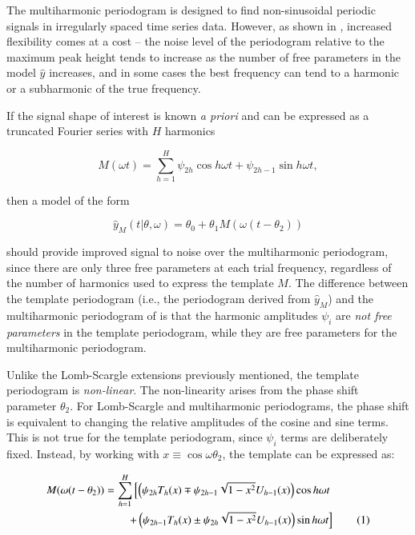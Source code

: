 \documentclass{webofc}
\newcommand\numberthis{\addtocounter{equation}{1}\tag{\theequation}}
\begin{document}
The multiharmonic periodogram is designed to find non-sinusoidal periodic signals in irregularly spaced time series data. However,
as shown in \cite{Vanderplas+Ivezic_2015}, increased flexibility comes at a cost -- the noise level of the periodogram relative to the 
maximum peak height tends to increase as the number of free parameters in the model $\hat{y}$ increases, and in some cases the best frequency
can tend to a harmonic or a subharmonic of the true frequency.

If the signal shape of interest is known \emph{a priori} and can be expressed as a truncated Fourier series with 
$H$ harmonics 

\begin{equation}\label{eq:template}
M(\omega t) = \sum_{h=1}^{H}\psi_{2h}\cos{h \omega t} + \psi_{2h-1}\sin{h \omega t},
\end{equation}

\noindent then a model of the form

\begin{equation}\label{eq:yhatftp}
\hat{y}_M(t|\theta, \omega) = \theta_0 + \theta_1 M(\omega (t - \theta_2))
\end{equation}

\noindent should provide improved signal to noise over the multiharmonic periodogram, since there are only three free parameters at
each trial frequency, regardless of the number of harmonics used to express the template $M$. The difference between the template
periodogram (i.e., the periodogram derived from $\hat{y}_M$) and the multiharmonic periodogram of \cite{Schwarzenberg-Czerny_1996,Palmer_2009} is that the
harmonic amplitudes $\psi_i$ are \emph{not free parameters} in the template periodogram, while they are free parameters for the 
multiharmonic periodogram.

Unlike the Lomb-Scargle extensions previously mentioned, the template periodogram is \emph{non-linear}. The non-linearity arises
from the phase shift parameter $\theta_2$. For Lomb-Scargle and multiharmonic periodograms, the phase shift is equivalent
to changing the relative amplitudes of the cosine and sine terms. This is not true for the template periodogram, since $\psi_i$ terms
are deliberately fixed. Instead, by working with $x \equiv \cos{\omega \theta_2}$, the template can be expressed as:

\begin{align*}
M(\omega (t - \theta_2)) &= \sum_{h=1}^H \left[\left(\psi_{2h}T_h(x) \mp \psi_{2h-1}\sqrt{1 - x^2}U_{h-1}(x)\right)\cos{h\omega t} \right.\\
&\quad\quad \left.+ \left(\psi_{2h-1}T_h(x) \pm \psi_{2h}\sqrt{1 - x^2}U_{h-1}(x)\right)\sin{h\omega t}\right]\numberthis \label{eq:mshift}
\end{align*}
\end{document}

